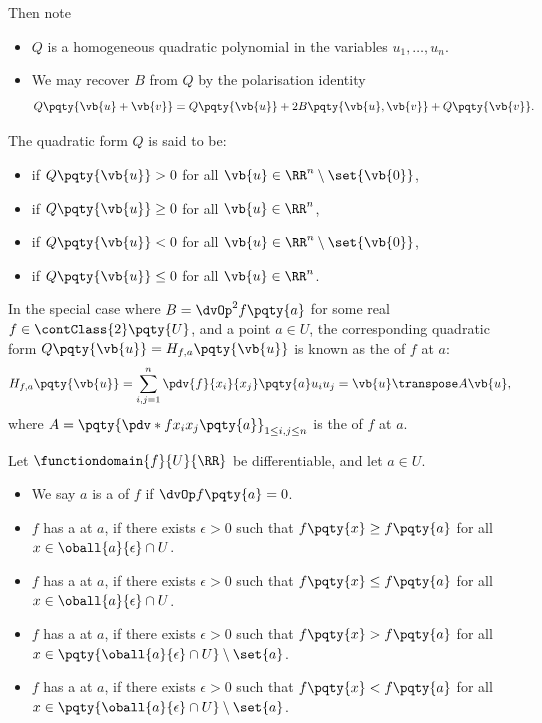 Then note
\begin{itemize}
    \item \(Q\) is a homogeneous quadratic polynomial in the variables \(u_1, \ldots, u_n\).
    \item We may recover \(B\) from \(Q\) by the polarisation identity
    \[
        Q\pqty{\vb{u} + \vb{v}} = Q\pqty{\vb{u}} + 2 B\pqty{\vb{u}, \vb{v}} + Q\pqty{\vb{v}}.
    \]
\end{itemize}

The quadratic form \(Q\) is said to be:
\begin{itemize}
    \item {} if \(Q\pqty{\vb{u}} > 0\) for all \(\vb{u} \in \RR^n \setminus \set{\vb{0}}\),
    \item {} if \(Q\pqty{\vb{u}} \geq 0\) for all \(\vb{u} \in \RR^n\),
    \item {} if \(Q\pqty{\vb{u}} < 0\) for all \(\vb{u} \in \RR^n \setminus \set{\vb{0}}\),
    \item {} if \(Q\pqty{\vb{u}} \leq 0\) for all \(\vb{u} \in \RR^n\).
\end{itemize}

In the special case where \(B = \dvOp^2 f\pqty{a}\) for some real \(f \in \contClass{2} \pqty{U}\), and a point \(a \in U\), the corresponding quadratic form \(Q\pqty{\vb{u}} = H_{f, a} \pqty{\vb{u}}\) is known as the  of \(f\) at \(a\):
\[
    H_{f, a} \pqty{\vb{u}} = \sum_{i, j = 1}^{n} \pdv{f}{x_i}{x_j}\pqty{a} u_i u_j = \vb{u} \transpose A \vb{u},
\]
where \(A = \pqty{\pdv*{f}{x_i}{x_j}\pqty{a}}_{1 \leq i, j \leq n}\) is the  of \(f\) at \(a\).

\begin{definition}
    Let \(\functiondomain{f}{U}{\RR}\) be differentiable, and let \(a \in U\).
    \begin{itemize}
        \item We say \(a\) is a  of \(f\) if \(\dvOp f\pqty{a} = 0\).
        \item \(f\) has a  at \(a\), if there exists \(\epsilon > 0\) such that \(f\pqty{x} \geq f\pqty{a}\) for all \(x \in \oball{a}{\epsilon} \cap U\).
        \item \(f\) has a  at \(a\), if there exists \(\epsilon > 0\) such that \(f\pqty{x} \leq f\pqty{a}\) for all \(x \in \oball{a}{\epsilon} \cap U\).
        \item \(f\) has a  at \(a\), if there exists \(\epsilon > 0\) such that \(f\pqty{x} > f\pqty{a}\) for all \(x \in \pqty{\oball{a}{\epsilon} \cap U} \setminus \set{a}\).
        \item \(f\) has a  at \(a\), if there exists \(\epsilon > 0\) such that \(f\pqty{x} < f\pqty{a}\) for all \(x \in \pqty{\oball{a}{\epsilon} \cap U} \setminus \set{a}\).
    \end{itemize}
\end{definition}

